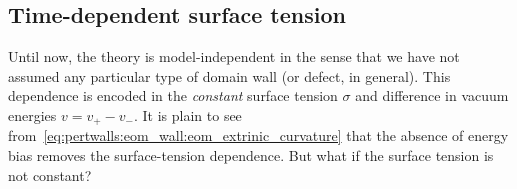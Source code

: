 






\subsection{Time-dependent surface tension}
    Until now, the theory is model-independent in the sense that we have not assumed any particular type of domain wall (or defect, in general). This dependence is encoded in the \emph{constant} surface tension $\sigma$ and difference in vacuum energies $v=v_+-v_-$. %
    It is plain to see from~\cref{eq:pertwalls:eom_wall:eom_extrinic_curvature} that the absence of energy bias removes the surface-tension dependence. %
    But what if the surface tension is not constant?


